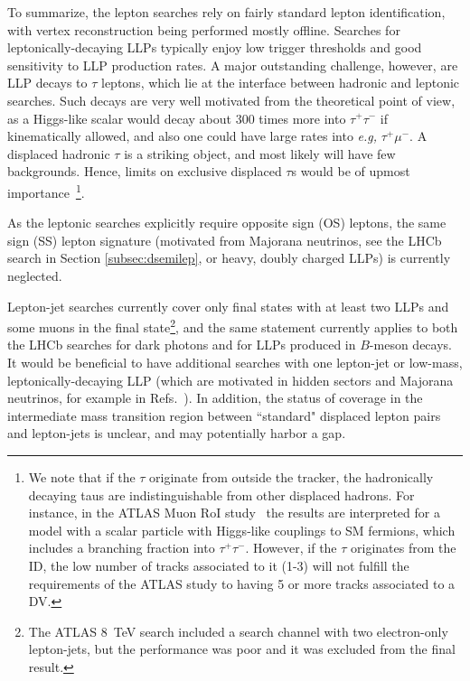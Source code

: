 To summarize, the lepton searches rely on fairly standard lepton identification, with vertex reconstruction being performed mostly offline. Searches for leptonically-decaying LLPs typically enjoy low trigger thresholds and good sensitivity to LLP production rates. A major outstanding challenge, however, are LLP decays to $\tau$ leptons, which lie at the interface between hadronic and leptonic searches. Such decays are very well motivated from the theoretical point of view, as a Higgs-like scalar would decay about 300 times more into $\tau^+ \tau^-$ if kinematically allowed, and also one could have large rates into \emph{e.g,} $\tau^+ \mu^-$.   A displaced hadronic $\tau$ is a striking object, and most likely will have few backgrounds. Hence, limits on exclusive displaced $\tau$s would be of upmost importance~\footnote{We note that if the $\tau$ originate from outside the tracker, the hadronically decaying taus are indistinguishable from other displaced hadrons. For instance, in the ATLAS Muon RoI study~\cite{Aad:2015uaa} the results are interpreted for a model with a scalar particle with Higgs-like couplings to SM fermions, which includes a branching fraction into $\tau^+ \tau^-$. However, if the $\tau$ originates from the ID, the low number of tracks associated to it (1-3) will not fulfill the requirements of the ATLAS study to having 5 or more tracks associated to a DV.}.

As the leptonic searches explicitly require opposite sign (OS) leptons, the same sign (SS) lepton signature (motivated from Majorana neutrinos, see the LHCb search in Section \ref{subsec:dsemilep}, or heavy, doubly charged LLPs) is currently neglected.

Lepton-jet searches currently cover only final states with at least two LLPs and some muons in the final state\footnote{The ATLAS 8~TeV search included a search channel with two electron-only lepton-jets, but the performance was poor and it was excluded from the final result.}, and the same statement currently applies to both the LHCb searches for dark photons and for LLPs produced in $B$-meson decays. It would be beneficial to have additional searches with one lepton-jet or low-mass, leptonically-decaying LLP (which are motivated in hidden sectors and Majorana neutrinos, for example in Refs.~\cite{Izaguirre:2015pga,Izaguirre:2015zva}). In addition, the status of coverage in the intermediate mass transition region between ``standard" displaced lepton pairs and lepton-jets is unclear, and may potentially harbor a gap.


